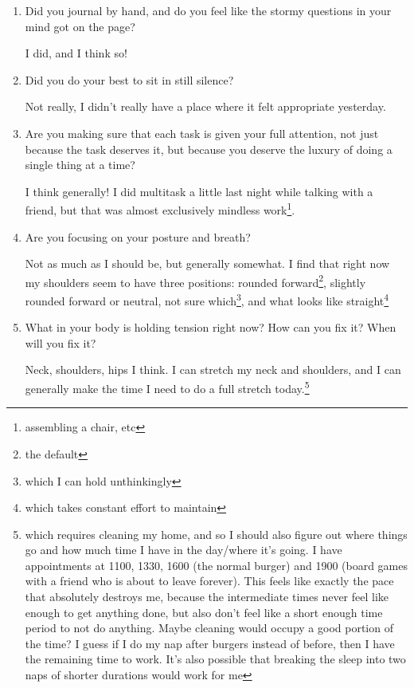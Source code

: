 \documentclass[12pt]{article}
\renewcommand{\,}{\textsuperscript{,}}
\begin{document}
\begin{enumerate}

\item Did you journal by hand, and do you feel like the stormy questions in your mind got on the page?

I did, and I think so!

\item Did you do your best to sit in still silence?

Not really, I didn't really have a place where it felt appropriate yesterday.

\item Are you making sure that each task is given your full attention, not just because the task deserves it, but because you deserve the luxury of doing a single thing at a time?

I think generally! I did multitask a little last night while talking with a friend, but that was almost exclusively mindless work\footnote{assembling a chair, etc}.

\item Are you focusing on your posture and breath?

Not as much as I should be, but generally somewhat. I find that right now my shoulders seem to have three positions: rounded forward\footnote{the default}, slightly rounded forward or neutral, not sure which\footnote{which I can hold unthinkingly}, and what looks like straight\footnote{which takes constant effort to maintain}

\item What in your body is holding tension right now? How can you fix it? When will you fix it?

Neck, shoulders, hips I think. I can stretch my neck and shoulders, and I can generally make the time I need to do a full stretch today.\footnote{which requires cleaning my home, and so I should also figure out where things go and how much time I have in the day/where it's going. I have appointments at 1100, 1330, 1600 (the normal burger) and 1900 (board games with a friend who is about to leave forever). This feels like exactly the pace that absolutely destroys me, because the intermediate times never feel like enough to get anything done, but also don't feel like a short enough time period to not do anything. Maybe cleaning would occupy a good portion of the time? I guess if I do my nap after burgers instead of before, then I have the remaining time to work. It's also possible that breaking the sleep into two naps of shorter durations would work for me}


\end{enumerate}
\end{document}
